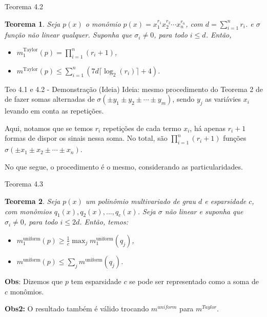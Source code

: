 \documentclass{beamer}
\newtheorem{teo}{Teorema}[section]
\theoremstyle{definition}
\begin{document}
\begin{frame}{Teorema 4.2}
    
    \begin{teo}
        Seja $p(x)$ o monômio $p(x) = x_1^{r_1} x_2^{r_2} \cdots x_n^{r_n}$, com $d = \sum_{i=1}^{n} r_i$. e $\sigma$ função não linear qualquer. Suponha que $\sigma_i \neq 0$, para todo $i\leq d$. Então,
        \begin{itemize}
          \item[(i)] $m_1^{\text{Taylor}}(p) = \prod_{i=1}^{n}(r_i + 1)$,
          \item[(ii)] $m^{\text{Taylor}}(p) \leq \sum_{i=1}^{n} \left(7d\lceil \log_2(r_i) \rceil + 4\right)$.
        \end{itemize}
    
    \end{teo}
\end{frame}

\begin{frame}{Teo 4.1 e 4.2 - Demonstração (Ideia)}
    Ideia: mesmo procedimento do Teorema 2 de  de fazer somas alternadas de $\sigma(\pm y_1 \pm y_2 \pm \cdots \pm y_m)$, sendo $y_j$ as variávies $x_i$ levando em conta as repetições. \pause
    
    
    Aqui, notamos que se temos $r_i$ repetições de cada termo $x_i$, há apenas $r_i+1$ formas de dispor os sinais nessa soma. \pause No total, são $\prod^n_{i=1} (r_i+1)$ funções $\sigma(\pm x_1 \pm x_2 \pm \cdots \pm x_n)$.

    \pause

    No que segue, o procedimento é o mesmo, considerando as particularidades.
\end{frame}

\begin{frame}{Teorema 4.3}
    \begin{teo}
        Seja $p(x)$ um polinômio multivariado de grau $d$ e esparsidade $c$, com monômios $q_1(x), q_2(x), \dots, q_c(x)$. Seja $\sigma$ não linear e suponha que $\sigma_i \neq 0$, para todo $i\leq 2d$. Então, temos:
        \begin{itemize}
        \item[(i)] $m_1^{\text{uniform}}(p) \geq \frac{1}{c} \max_j m_1^{\text{uniform}}(q_j)$,
        \item[(ii)] $m^{\text{uniform}}(p) \leq \sum_j m^{\text{uniform}}(q_j)$.
        \end{itemize}

    \end{teo}
    
    \pause \textbf{Obs}: Dizemos que $p$ tem esparsidade $c$ se pode ser representado como a soma de $c$ monômios. 
    
    \pause \textbf{Obs2:} O resultado também é válido trocando $m^{uniform}$ para $m^{Taylor}$.
\end{frame}
\end{document}

